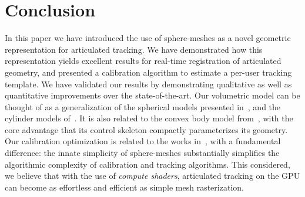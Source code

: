 \section{Conclusion}
\label{sec:conclusion}

In this paper we have introduced the use of sphere-meshes as a novel geometric representation for articulated tracking. We have demonstrated how this representation yields excellent results for real-time registration of articulated geometry, and presented a calibration algorithm to estimate a per-user tracking template. We have validated our results by demonstrating qualitative as well as quantitative improvements over the state-of-the-art. Our volumetric model can be thought of as a generalization of the spherical models presented in~\cite{sridhar2015fast,qian2014realtime}, and the cylinder models of~\cite{oiko2011hand,tagliasacchi2015robust}. It is also related to the convex body model from~\cite{melax2013dynamics}, with the core advantage that its control skeleton compactly parameterizes its geometry. Our calibration optimization is related to the works in~\cite{taylor2014user,khamis15learning,tan2016fitsglove}, with a fundamental difference: the innate simplicity of sphere-meshes substantially simplifies the algorithmic complexity of calibration and tracking algorithms. This considered, we believe that with the use of \emph{compute shaders}, articulated tracking on the GPU can become as effortless and efficient as simple mesh rasterization.

